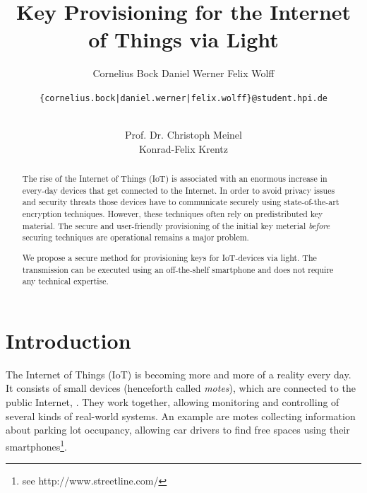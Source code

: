 \documentclass{sig-alternate} %
\begin{document}
\title{Key Provisioning for the Internet of Things via Light}


\author{
\alignauthor
Cornelius Bock
%
\alignauthor
Daniel Werner
%
\alignauthor
Felix Wolff
%
\and
\texttt{\{cornelius.bock|daniel.werner|felix.wolff\}@student.hpi.de} \\ \\
\and
\alignauthor
Prof. Dr. Christoph Meinel\\
%
\alignauthor
Konrad-Felix Krentz\\
}

\maketitle

\begin{abstract}
The rise of the Internet of Things (IoT) is associated with an enormous increase in every-day devices that get connected to the Internet.
In order to avoid privacy issues and security threats those devices have to communicate securely using state-of-the-art encryption techniques.
However, these techniques often rely on predistributed key material.
The secure and user-friendly provisioning of the initial key meterial \textit{before} securing techniques are operational remains a major problem.

We propose a secure method for provisioning keys for IoT-devices via light.
The transmission can be executed using an off-the-shelf smartphone and does not require any technical expertise.
\end{abstract}




\section{Introduction}
\label{sec:introduction}

The Internet of Things (IoT) is becoming more and more of a reality every day.
It consists of small devices (henceforth called \textit{motes}), which are connected to the public Internet, \cite{atzori2010internet}.
They work together, allowing monitoring and controlling of several kinds of real-world systems.
An example are motes collecting information about parking lot occupancy, allowing car drivers to find free spaces using their smartphones\footnote{see http://www.streetline.com/}.
\end{document}
